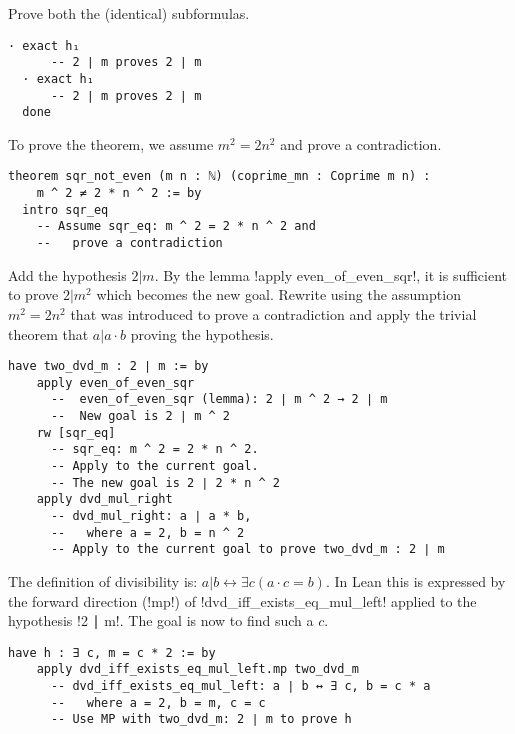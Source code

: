 \newpage

Prove both the (identical) subformulas.
\begin{Verbatim}[firstnumber=last]
  · exact h₁
      -- 2 ∣ m proves 2 ∣ m
  · exact h₁
      -- 2 ∣ m proves 2 ∣ m
  done
\end{Verbatim}


To prove the theorem, we assume $m^2=2n^2$ and prove a contradiction.
\begin{Verbatim}[firstnumber=last]
theorem sqr_not_even (m n : ℕ) (coprime_mn : Coprime m n) :
    m ^ 2 ≠ 2 * n ^ 2 := by
  intro sqr_eq
    -- Assume sqr_eq: m ^ 2 = 2 * n ^ 2 and
    --   prove a contradiction
\end{Verbatim}

Add the hypothesis $2|m$. By the lemma !apply even_of_even_sqr!, it is sufficient to prove $2 | m^2$ which becomes the new goal. Rewrite using the assumption $m^2=2n^2$ that was introduced to prove a contradiction and apply the trivial theorem that $a | a\cdot b$ proving the hypothesis.

\begin{Verbatim}[firstnumber=last]
  have two_dvd_m : 2 ∣ m := by
    apply even_of_even_sqr
      --  even_of_even_sqr (lemma): 2 ∣ m ^ 2 → 2 ∣ m
      --  New goal is 2 ∣ m ^ 2
    rw [sqr_eq]
      -- sqr_eq: m ^ 2 = 2 * n ^ 2.
      -- Apply to the current goal.
      -- The new goal is 2 ∣ 2 * n ^ 2
    apply dvd_mul_right
      -- dvd_mul_right: a ∣ a * b,
      --   where a = 2, b = n ^ 2
      -- Apply to the current goal to prove two_dvd_m : 2 ∣ m
\end{Verbatim}

The definition of divisibility is: $a|b\leftrightarrow \exists c ( a\cdot c = b)$. In Lean this is expressed by the forward direction (!mp!) of !dvd_iff_exists_eq_mul_left! applied to the hypothesis !2 ∣ m!. The goal is now to find such a $c$.
\begin{Verbatim}[firstnumber=last]
  have h : ∃ c, m = c * 2 := by
    apply dvd_iff_exists_eq_mul_left.mp two_dvd_m
      -- dvd_iff_exists_eq_mul_left: a ∣ b ↔ ∃ c, b = c * a
      --   where a = 2, b = m, c = c
      -- Use MP with two_dvd_m: 2 ∣ m to prove h
\end{Verbatim}

